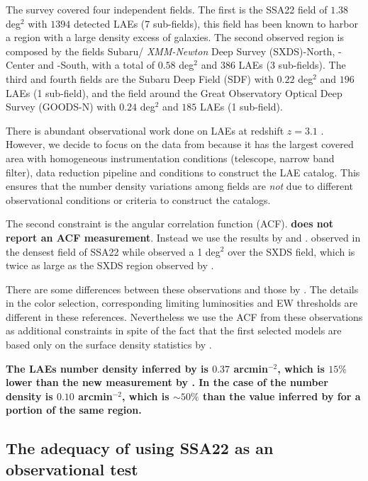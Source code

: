 \documentclass[usenatbib]{mn2e}
\begin{document}
The survey covered four independent fields. The first is the SSA22
field of $1.38$ deg$^2$ with $1394$ detected LAEs (7 sub-fields), this
field has been known to harbor a region with a large density excess of
galaxies. The second observed region is composed by the fields Subaru/{\it
  XMM-Newton} Deep Survey (SXDS)-North, -Center and -South, with a
total of $0.58$ deg$^2$ and $386$ LAEs (3 sub-fields). The third and
fourth fields are the Subaru Deep Field (SDF) with $0.22$ deg$^2$ and
$196$ LAEs (1 sub-field), and the field around the Great Observatory
Optical Deep Survey  (GOODS-N) with $0.24$ deg$^2$ and $185$ LAEs (1
sub-field).  

There is abundant observational work done on LAEs at redshift $z=3.1$
\citep{Kudritzki2000,Matsuda2005,Gawiser2007,Nilsson2007,Ouchi2008}.
However, we decide to focus on the data from \cite{Yamada2012} because
it has the largest covered area with homogeneous instrumentation
conditions (telescope, narrow band filter), data reduction pipeline
and conditions to construct the LAE catalog. This ensures that the
number density variations among fields are \emph{not} due to different
observational conditions or criteria to construct the catalogs.

The second constraint is the angular correlation function
(ACF). {\bf \cite{Yamada2012} does not report an ACF measurement}. Instead
we use the results by \cite{Hayashino2004} and
\cite{Ouchi2008,Ouchi2010}. \cite{Hayashino2004} observed in the
densest field of SSA22 while \cite{Ouchi2008} observed a 1 deg$^2$
over the SXDS field, which is twice as large as the SXDS region
observed by \cite{Yamada2012}.

There are some differences between these observations and those by
\cite{Yamada2012}. The details in the color selection, corresponding
limiting luminosities and EW thresholds are different in these
references. Nevertheless we use the ACF from these observations as
additional constraints in spite of the fact that the first selected
models are based only on the surface density statistics by \cite{Yamada2012}.  

{\bf The LAEs number density inferred by \cite{Hayashino2004} is
  $0.37$ arcmin$^{-2}$, which is $15\%$ lower than the new measurement
by \cite{Yamada2012}. In the case of \cite{Ouchi2008} the number
density is $0.10$ arcmin$^{-2}$, which is $\sim 50\%$ than the value
inferred by \cite{Yamada2012} for a portion of the same region.}

\subsection{The adequacy of using SSA22 as an observational test}
\end{document}
